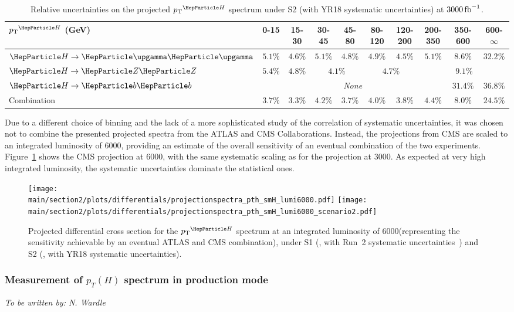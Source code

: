 \begin{table}[htb]
\footnotesize
\begin{center}
\begin{tabular}{l|c|c|c|c|c|c|c|c|c}
$\pTH$ (GeV)       & 0-15    &  15-30   &  30-45    &  45-80   &  80-120  &  120-200  &  200-350  &  350-600  &  600-$\infty$  \\
\hline
$\hgg$       & $5.1\%$ & $4.6\%$ & $5.1\%$ & $4.8\%$            & $4.9\%$ & $4.5\%$            & $5.1\%$ & $8.6\%$  & $32.2\%$ \\ 
$\hzz$       & $5.4\%$ & $4.8\%$ & \multicolumn{2}{c|}{$4.1\%$} & \multicolumn{2}{c|}{$4.7\%$} & \multicolumn{3}{c}{$9.1\%$} \\ 
$\hbb$       & \multicolumn{7}{c|}{\textit{None}}                                              & $31.4\%$ & $36.8\%$ \\ 
Combination  & $3.7\%$ & $3.3\%$ & $4.2\%$ & $3.7\%$            & $4.0\%$ & $3.8\%$            & $4.4\%$ & $8.0\%$  & $24.5\%$ \\
\end{tabular}
\end{center}
\caption{
    Relative uncertainties on the projected $\pTH$ spectrum under S2 (with YR18 systematic uncertainties) at $3000\mbox{\ensuremath{\,\text{fb}^\text{$-$1}}}$.
    }
\label{tab:proj_pth_unc_scen2}
\end{table}


Due to a different choice of binning and the lack of a more sophisticated study of the correlation of systematic uncertainties, it was chosen not to combine the presented projected spectra from the ATLAS and CMS Collaborations.
% 
Instead, the projections from CMS are scaled to an integrated luminosity of 6000\fbinv, providing an estimate of the overall sensitivity of an eventual combination of the two experiments.
% 
Figure~\ref{fig:proj_pth_6000} shows the CMS projection at 6000\fbinv, with the same systematic scaling as for the projection at 3000\fbinv.
% 
As expected at very high integrated luminosity, the systematic uncertainties dominate the statistical ones.


\begin{figure}[hbtp]
  \begin{center}
\texttt{[image: \\main/section2/plots/differentials/projectionspectra\_pth\_smH\_lumi6000.pdf]}
\texttt{[image: \\main/section2/plots/differentials/projectionspectra\_pth\_smH\_lumi6000\_scenario2.pdf]}
    \caption{
        Projected differential cross section for the $\pTH$ spectrum at an integrated luminosity of 6000\fbinv (representing the sensitivity achievable by an eventual ATLAS and CMS combination), under S1 (\UcmsLeft, with Run~2 systematic uncertainties~\cite{CMS-PAS-HIG-17-028}) and S2 (\UcmsRight, with YR18 systematic uncertainties).
        }
    \label{fig:proj_pth_6000}
  \end{center}
\end{figure}



\subsubsection{Measurement of $p_{T}(H)$ spectrum  in \ttH production mode}
\begin{center}{\it To be written by: N. Wardle} \end{center}
